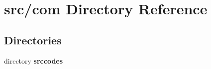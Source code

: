 \section{src/com Directory Reference}
\label{dir_c38e78fc4f85647c895d57aa390e90a8}
\subsection*{Directories}
\begin{DoxyCompactItemize}
\item 
directory {\bf srccodes}
\end{DoxyCompactItemize}
